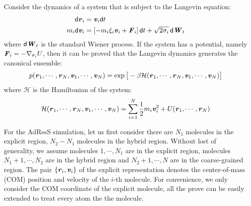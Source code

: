 \documentclass[aps,pre,preprint,unsortedaddress]{revtex4}
\renewcommand{\v}[1]{\textbf{\textit{#1}}}
\renewcommand{\d}[1]{\textsf{#1}}
\begin{document}
Consider the dynamics of a system that is subject to the Langevin equation:
\begin{align}
  \d d\v r_i &= \v v_i\d dt\\
  m_i\d d\v v_i &= [-m_i\xi_i\v v_i + \v F_i]\,\d dt + \sqrt{2\sigma_i}\,\d d\v W_t
\end{align}
where $\d d\v W_t$ is the standard Wiener process.  If the system has a
potential, namely $\v F_i = -\nabla_{\v r_i}U$, then it can be proved that the
Langevin dynamics generates the canonical ensemble:
\begin{align}
  p(\v r_1, \cdots, \v r_N, \v v_1, \cdots, \v v_N)
  = \exp\big[
  -\beta \mathcal H(\v r_1, \cdots, \v r_N, \v v_1, \cdots, \v v_N)
  \big]
\end{align}
where $\mathcal H$ is the Hamiltonian of the system:
\begin{align}
  \mathcal H(\v r_1, \cdots, \v r_N, \v v_1, \cdots, \v v_N)
  =
  \sum_{i=1}^N\frac12 m_i\v v_i^2 + U(\v r_1, \cdots, \v r_N)  
\end{align}

For the AdResS simulation, let us first consider there are $N_1$
molecules in the explicit region, $N_2 - N_1$ molecules in the hybrid
region.  Without lost of generality, we assume molecules $1, \cdots,
N_1$ are in the explicit region, molecules $N_1 + 1, \cdots, N_2$ are
in the hybrid region and $N_2+1, \cdots, N$ are in the coarse-grained
region. The pair $\{\v r_i, \v v_i\}$ of the explicit representation
denotes the center-of-mass (COM) position and velocity of the $i$-th
molecule. For convenience, we only consider the COM coordinate of the
explicit molecule, all the prove can be easily extended to treat every
atom the the molecule.
\end{document}
